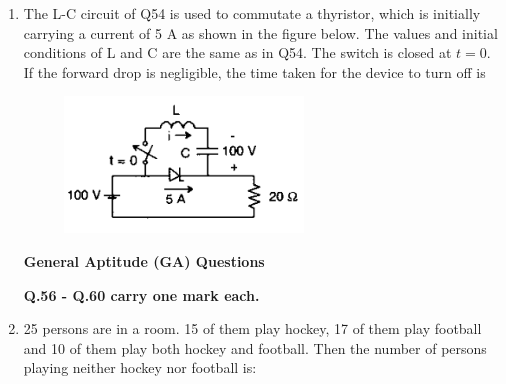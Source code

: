 \documentclass[12pt]{article}
\theoremstyle{remark}
\begin{document}
\begin{enumerate}
\item The L-C circuit of Q54 is used to commutate a thyristor, which is initially carrying a current of 5 A as shown in the figure below. The values and initial conditions of L and C are the same as in Q54. The switch is closed at $t=0$. If the forward drop is negligible, the time taken for the device to turn off is
\begin{figure}[H]
    \centering
    \includegraphics[width=0.6\textwidth]{Figs/Q55.png}
    \caption{}
    \label{fig:1.52}
\end{figure}
\begin{enumerate}
\end{enumerate}
\hfill{}
\newpage
\begin{flushleft}
\textbf{General Aptitude (GA) Questions}
\end{flushleft}

\textbf{Q.56 - Q.60 carry one mark each.}

\item 25 persons are in a room. 15 of them play hockey, 17 of them play football and 10 of them play both hockey and football. Then the number of persons playing neither hockey nor football is:
\begin{enumerate}
\end{enumerate}
\hfill{}


\end{enumerate}
\end{document}
